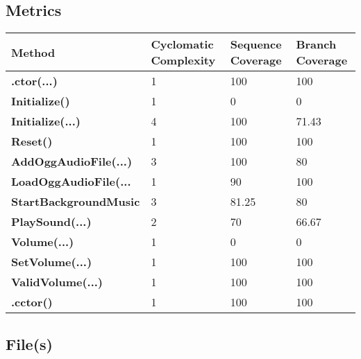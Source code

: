 \documentclass[a4paper,10pt]{article}
\begin{document}
\subsection{Metrics}
\begin{longtable}[l]{|l|l|l|l|}
\hline
\textbf{Method} & \textbf{Cyclomatic Complexity} & \textbf{Sequence Coverage} & \textbf{Branch Coverage}\\
\hline
\textbf{.ctor(...)} & 1 & 100 & 100\\
\hline
\textbf{Initialize()} & 1 & 0 & 0\\
\hline
\textbf{Initialize(...)} & 4 & 100 & 71.43\\
\hline
\textbf{Reset()} & 1 & 100 & 100\\
\hline
\textbf{AddOggAudioFile(...)} & 3 & 100 & 80\\
\hline
\textbf{LoadOggAudioFile(...} & 1 & 90 & 100\\
\hline
\textbf{StartBackgroundMusic} & 3 & 81.25 & 80\\
\hline
\textbf{PlaySound(...)} & 2 & 70 & 66.67\\
\hline
\textbf{Volume(...)} & 1 & 0 & 0\\
\hline
\textbf{SetVolume(...)} & 1 & 100 & 100\\
\hline
\textbf{ValidVolume(...)} & 1 & 100 & 100\\
\hline
\textbf{.cctor()} & 1 & 100 & 100\\
\hline
\end{longtable}
\subsection{File(s)}
\end{document}
